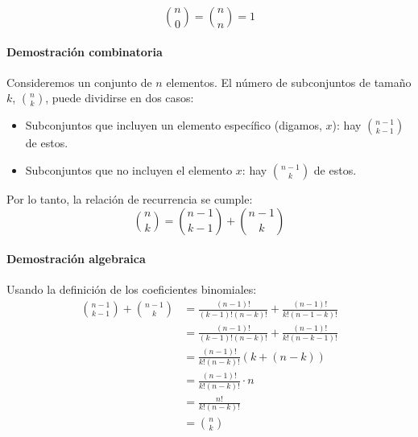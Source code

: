 \documentclass[12pt, a4paper]{article}
\theoremstyle{rioplatense}
\begin{document}
\begin{equation*}
\binom{n}{0} = \binom{n}{n} = 1
\end{equation*}


\paragraph{Demostración combinatoria}

Consideremos un conjunto de $n$ elementos. El número de subconjuntos de tamaño $k$, $\binom{n}{k}$, puede dividirse en dos casos:
\begin{itemize}
    \item Subconjuntos que incluyen un elemento específico (digamos, $x$): hay $\binom{n-1}{k-1}$ de estos.
    \item Subconjuntos que no incluyen el elemento $x$: hay $\binom{n-1}{k}$ de estos.
\end{itemize}
Por lo tanto, la relación de recurrencia se cumple:
\begin{equation*}
\binom{n}{k} = \binom{n-1}{k-1} + \binom{n-1}{k}
\end{equation*}
\paragraph{Demostración algebraica}
Usando la definición de los coeficientes binomiales:
\begin{align*}
\binom{n-1}{k-1} + \binom{n-1}{k} &= \frac{(n-1)!}{(k-1)!(n-k)!} + \frac{(n-1)!}{k!(n-1-k)!} \\
&= \frac{(n-1)!}{(k-1)!(n-k)!} + \frac{(n-1)!}{k!(n-k-1)!} \\
&= \frac{(n-1)!}{k!(n-k)!} \left( k + (n-k) \right) \\
&= \frac{(n-1)!}{k!(n-k)!} \cdot n \\
&= \frac{n!}{k!(n-k)!} \\
&= \binom{n}{k}
\end{align*}
\end{document}
